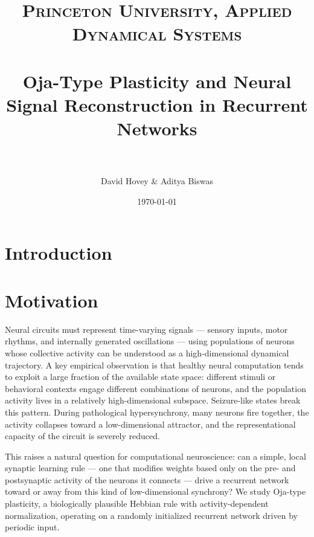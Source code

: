 \documentclass[paper=a4, fontsize=11pt]{scrartcl} %
\title{
\normalfont \normalsize
\textsc{Princeton University, Applied Dynamical Systems} \\ [25pt] %
\horrule{0.5pt} \\[0.4cm] %
\huge Oja-Type Plasticity and Neural Signal Reconstruction in Recurrent Networks  \\ %
\horrule{2pt} \\[0.5cm] %
}
\author{David Hovey \& Aditya Biswas} %
\date{\normalsize\today} %
\numberwithin{equation}{section} %
\numberwithin{figure}{section} %
\numberwithin{table}{section} %
\begin{document}
\maketitle %


\section{Introduction}


\section{Motivation}

Neural circuits must represent time-varying signals — sensory inputs, motor rhythms,
and internally generated oscillations — using populations of neurons whose collective
activity can be understood as a high-dimensional dynamical trajectory.  A key empirical
observation is that healthy neural computation tends to exploit a large fraction of the
available state space: different stimuli or behavioral contexts engage different
combinations of neurons, and the population activity lives in a relatively
high-dimensional subspace.  Seizure-like states break this pattern.  During pathological
hypersynchrony, many neurons fire together, the activity collapses toward a
low-dimensional attractor, and the representational capacity of the circuit is severely
reduced.

This raises a natural question for computational neuroscience: can a simple, local
synaptic learning rule — one that modifies weights based only on the pre- and
postsynaptic activity of the neurons it connects — drive a recurrent network toward or
away from this kind of low-dimensional synchrony?  We study Oja-type plasticity, a
biologically plausible Hebbian rule with activity-dependent normalization, operating
on a randomly initialized recurrent network driven by periodic input.
\end{document}
